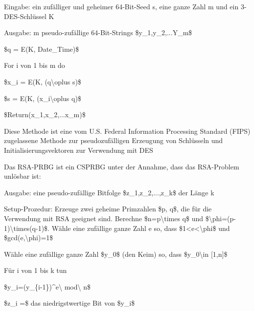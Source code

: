 \documentclass[a4paper]{article}
\begin{document}
\begin{multicols}{3}
\begin{itemize*}
            \begin{itemize*}
                  \item Eingabe: ein zufälliger und geheimer 64-Bit-Seed s, eine ganze Zahl m und ein 3-DES-Schlüssel K
                  \item Ausgabe: m pseudo-zufällige 64-Bit-Strings \$y\_1,y\_2,...Y\_m\$
                  \begin{enumerate*} \def\labelenumi{\arabic{enumi}.} \item \$q = E(K, Date\_Time)\$ \item For i von 1 bis m do
                        \begin{enumerate*} \def\labelenumii{\arabic{enumii}.} \item \$x\_i = E(K, (q\textbackslash oplus s)\$ \item \$s = E(K, (x\_i\textbackslash oplus q)\$ \end{enumerate*} \item \$Return(x\_1,x\_2,...x\_m)\$ \end{enumerate*}
                  \item Diese Methode ist eine vom U.S. Federal Information Processing Standard (FIPS) zugelassene Methode zur pseudozufälligen Erzeugung von Schlüsseln und Initialisierungsvektoren zur Verwendung mit DES
            \end{itemize*}
            \item
            Das RSA-PRBG ist ein CSPRBG unter der Annahme, dass das RSA-Problem
            unlösbar ist:

            \begin{itemize*}
                  \item Ausgabe: eine pseudo-zufällige Bitfolge \$z\_1,z\_2,...,z\_k\$ der Länge k
            \end{itemize*}

            \begin{enumerate*}
                  \def\labelenumi{\arabic{enumi}.}
                  \item Setup-Prozedur: Erzeuge zwei geheime Primzahlen \$p, q\$, die für die Verwendung mit RSA geeignet sind. Berechne \$n=p\textbackslash times q\$ und \$\textbackslash phi=(p-1)\textbackslash times(q-1)\$. Wähle eine zufällige ganze Zahl e so, dass \$1\textless e\textless\textbackslash phi\$ und \$gcd(e,\textbackslash phi)=1\$
                  \item Wähle eine zufällige ganze Zahl \$y\_0\$ (den Keim) so, dass \$y\_0\textbackslash in {[}1,n{]}\$
                  \item Für i von 1 bis k tun
                  \begin{enumerate*} \def\labelenumii{\arabic{enumii}.} \item \$y\_i=(y\_\{i-1\})\^{}e\textbackslash{} mod\textbackslash{} n\$ \item \$z\_i =\$ das niedrigstwertige Bit von \$y\_i\$ \end{enumerate*}
            \end{enumerate*}


\end{itemize*}
\end{multicols}
\end{document}
